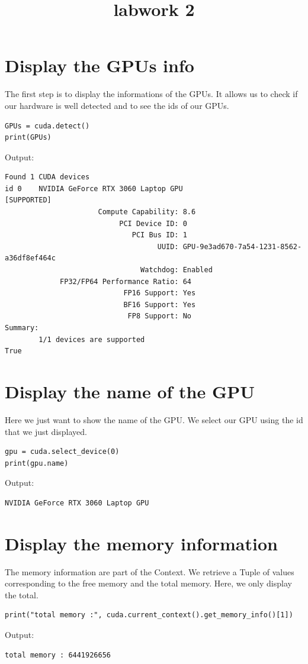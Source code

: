 \documentclass{report}
\begin{document}
\title{labwork 2}
\maketitle

\section{Display the GPUs info}
The first step is to display the informations of the GPUs. It allows us to check if our hardware is well detected and to see the ids of our GPUs.
\begin{lstlisting}
GPUs = cuda.detect()
print(GPUs)
\end{lstlisting}
Output:
\begin{verbatim}
Found 1 CUDA devices
id 0    NVIDIA GeForce RTX 3060 Laptop GPU                              [SUPPORTED]
                      Compute Capability: 8.6
                           PCI Device ID: 0
                              PCI Bus ID: 1
                                    UUID: GPU-9e3ad670-7a54-1231-8562-a36df8ef464c
                                Watchdog: Enabled
             FP32/FP64 Performance Ratio: 64
                            FP16 Support: Yes
                            BF16 Support: Yes
                             FP8 Support: No
Summary:
        1/1 devices are supported
True
\end{verbatim}

\section{Display the name of the GPU}
Here we just want to show the name of the GPU. We select our GPU using the id that we just displayed.
\begin{lstlisting}
gpu = cuda.select_device(0)
print(gpu.name)
\end{lstlisting}
Output:
\begin{verbatim}
NVIDIA GeForce RTX 3060 Laptop GPU
\end{verbatim}

\section{Display the memory information}
The memory information are part of the Context. We retrieve a Tuple of values corresponding to the free memory and the total memory. Here, we only display the total. 
\begin{lstlisting}
print("total memory :", cuda.current_context().get_memory_info()[1])
\end{lstlisting}
Output:
\begin{verbatim}
total memory : 6441926656
\end{verbatim}
\end{document}
